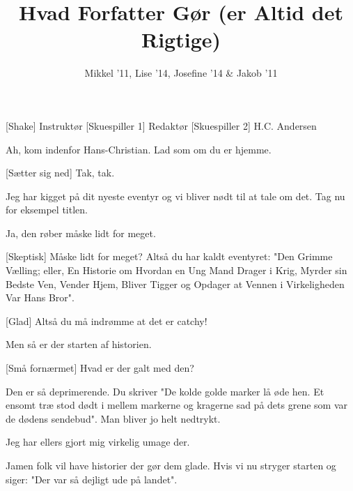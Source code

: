 \documentclass[a4paper,11pt]{article}
\title{Hvad Forfatter Gør (er Altid det Rigtige)}
\author{Mikkel '11, Lise '14, Josefine '14 \& Jakob '11}
\begin{document}
\maketitle

\begin{roles}
[Shake] Instruktør
[Skuespiller 1] Redaktør
[Skuespiller 2] H.C. Andersen
\end{roles}

\begin{props}
\end{props}

\begin{sketch}



 Ah, kom indenfor Hans-Christian.  Lad som om du er hjemme.

[Sætter sig ned] Tak, tak.

 Jeg har kigget på dit nyeste eventyr og vi bliver nødt til at tale om det. Tag nu for eksempel titlen. 

 Ja, den røber måske lidt for meget. 

 [Skeptisk] Måske lidt for meget? Altså du har kaldt eventyret: "Den Grimme Vælling; eller, En Historie om Hvordan en Ung Mand Drager i Krig, Myrder sin Bedste Ven, Vender Hjem, Bliver Tigger og Opdager at Vennen i Virkeligheden Var Hans Bror". %

[Glad] Altså du må indrømme at det er catchy! 

  Men så er der starten af historien.

[Små fornærmet] Hvad er der galt med den? 

  Den er så deprimerende. Du skriver "De kolde golde marker lå øde hen. Et ensomt træ stod dødt i mellem markerne og kragerne sad på dets grene som var de dødens sendebud". Man bliver jo helt nedtrykt.

 Jeg har ellers gjort mig virkelig umage der.

  Jamen folk vil have historier der gør dem glade.  Hvis vi nu stryger starten og siger: "Der var så dejligt ude på landet".


\end{sketch}
\end{document}
